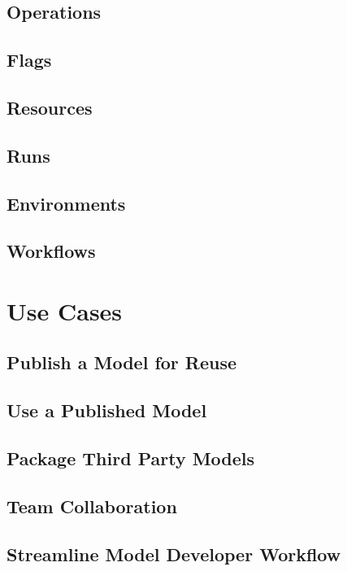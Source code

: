 \documentclass{article}
\begin{document}
\subsection{Operations}

\subsection{Flags}

\subsection{Resources}

\subsection{Runs}

\subsection{Environments}

\subsection{Workflows}

\section{Use Cases}

\subsection{Publish a Model for Reuse}

\subsection{Use a Published Model}

\subsection{Package Third Party Models}

\subsection{Team Collaboration}

\subsection{Streamline Model Developer Workflow}
\end{document}
